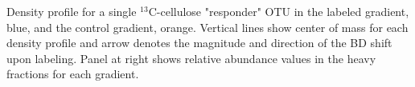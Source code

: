 Density profile for a single $^13$C-cellulose "responder" OTU in the labeled gradient, blue, and the control gradient, orange. Vertical lines show center of mass for each density profile and arrow denotes the magnitude and direction of the BD shift upon labeling. Panel at right shows relative abundance values in the heavy fractions for each gradient. 
